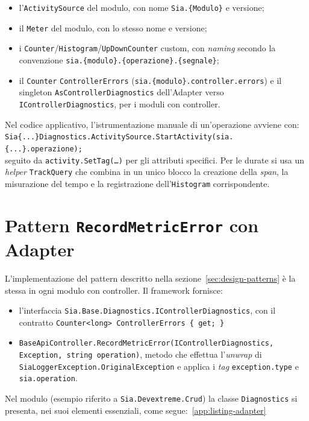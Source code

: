 \begin{itemize}
      \item l'\texttt{ActivitySource} del modulo, con nome \texttt{Sia.\{Modulo\}} e versione;
      \item il \texttt{Meter} del modulo, con lo stesso nome e versione;
      \item i \texttt{Counter}/\texttt{Histogram}/\texttt{UpDownCounter} custom, con
            \emph{naming} secondo la convenzione \texttt{sia.\{modulo\}.\{operazione\}.\{segnale\}};
      \item il \texttt{Counter} \texttt{ControllerErrors}
            (\texttt{sia.\{modulo\}.controller.errors}) e il singleton
            \texttt{AsControllerDiagnostics} dell'Adapter verso \texttt{IControllerDiagnostics}, per i moduli con controller.
\end{itemize}
Nel codice applicativo, l'istrumentazione manuale di un'operazione avviene con:
\\
\texttt{Sia\{...\}Diagnostics.ActivitySource.StartActivity(\textquotedbl sia.\{...\}.operazione\textquotedbl);}
\\
seguito da \texttt{activity.SetTag(\ldots)} per gli attributi specifici. Per le durate si
usa un \emph{helper} \texttt{TrackQuery} che combina in un unico blocco la creazione della
\emph{span}, la misurazione del tempo e la registrazione dell'\texttt{Histogram}
corrispondente.

\section{Pattern \texttt{RecordMetricError} con Adapter}

L'implementazione del pattern descritto nella sezione~\ref{sec:design-patterns} è la stessa
in ogni modulo con controller. Il framework fornisce:
\begin{itemize}
      \item l'interfaccia \texttt{Sia.Base.Diagnostics.IControllerDiagnostics}, con il contratto
            \texttt{Counter<long> ControllerErrors \{ get; \}}
      \item \texttt{BaseApiController.RecordMetricError(IControllerDiagnostics,\\ Exception, string operation)},
            metodo che effettua l'\emph{unwrap} di \\ \texttt{SiaLoggerException.OriginalException}
            e applica i \emph{tag} \texttt{exception.type} e \texttt{sia.operation}.
\end{itemize}
Nel modulo (esempio riferito a \texttt{Sia.Devextreme.Crud}) la classe \texttt{Diagnostics}
si presenta, nei suoi elementi essenziali, come segue:~\ref{app:listing-adapter}

